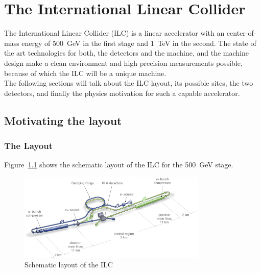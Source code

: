 \chapter{The International Linear Collider}
\label{ILC}
The International Linear Collider (ILC) is a linear \electron \positron accelerator with an center-of-mass energy of \SI{500}{\GeV} in the first stage and \SI{1}{\TeV} in the second.
The state of the art technologies for both, the detectors and the machine, and the machine design make a clean environment and high precision measurements possible, because of which the ILC will be a unique machine.\\
The following sections will talk about the ILC layout, its possible sites, the two detectors, and finally the physics motivation for such a capable accelerator.

\section{Motivating the layout}
\label{ILC:layout}

\subsection{The Layout}
Figure~\ref{fig:ILC_Layout} shows the schematic layout of the ILC for the \SI{500}{\GeV} stage.
\begin{figure}
\centering
\includegraphics[width=0.8\textwidth]{Figures/ILC_layout.png}
\caption[Schematic layout of the ILC]{Schematic layout of the ILC~\cite[p. 9]{TDR1}}
\label{fig:ILC_Layout}
\end{figure}

